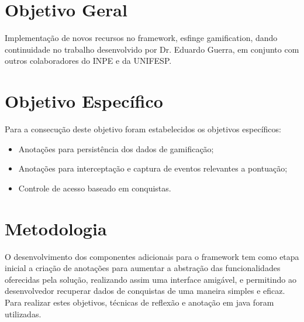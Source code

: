 \section{Objetivo Geral}

\par Implementação de novos recursos no framework, esfinge gamification, dando continuidade no trabalho desenvolvido por Dr. Eduardo Guerra, em conjunto com outros colaboradores do INPE e da UNIFESP. 

\section{Objetivo Espec\'ifico}

\par Para a consecução deste objetivo foram estabelecidos os objetivos específicos:
\begin{itemize}
    \item Anotações para persistência dos dados de gamificação;
    \item Anotações para interceptação e captura de eventos relevantes a pontuação;
    \item Controle de acesso baseado em conquistas.
\end{itemize}

\section{Metodologia}

\par O desenvolvimento dos componentes adicionais para o framework tem como etapa inicial a criação de anotações para aumentar a abstração das funcionalidades oferecidas pela solução, realizando assim uma interface amigável, e permitindo ao desenvolvedor recuperar dados de conquistas de uma maneira simples e eficaz. Para realizar estes objetivos, técnicas de reflexão e anotação em java foram utilizadas.